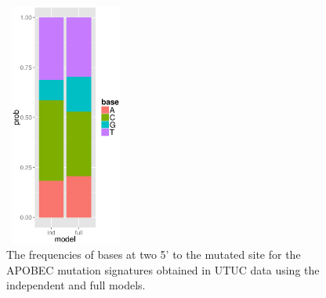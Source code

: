 \documentclass{article}
\begin{document}
\begin{figure}
\centering
\includegraphics[width=4cm,height=8cm]{UTUC_APOBEC_twoFivePrime.eps}
\caption{The frequencies of bases at two 5' to the mutated site for the APOBEC mutation signatures obtained in UTUC data using the independent and full models.}
\label{UTUC_APOBEC_twoFivePrime}
\end{figure}
\end{document}
